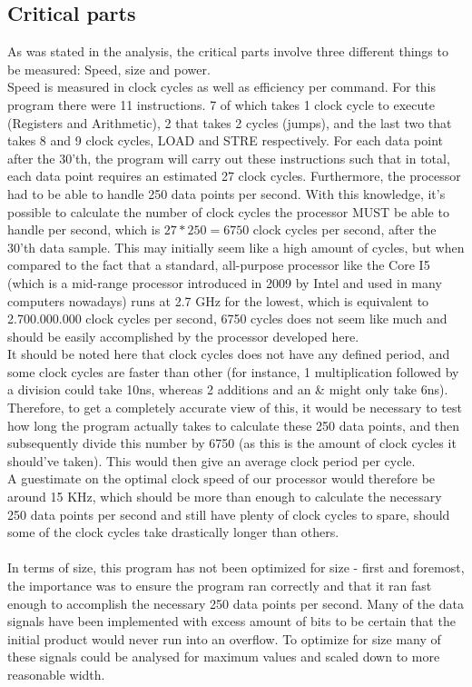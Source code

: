 \documentclass[12pt,a4paper]{article}
\begin{document}
\subsection{Critical parts}
	As was stated in the analysis, the critical parts involve three different things to be measured: Speed, size and power.\\
	Speed is measured in clock cycles as well as efficiency per command. For this program there were 11 instructions. 7 of which takes 1 clock cycle to execute (Registers and Arithmetic), 2 that takes 2 cycles (jumps), and the last two that takes 8 and 9 clock cycles, LOAD and STRE respectively. For each data point after the 30'th, the program will carry out these instructions such that in total, each data point requires an estimated 27 clock cycles. Furthermore, the processor had to be able to handle 250 data points per second. With this knowledge, it's possible to calculate the number of clock cycles the processor MUST be able to handle per second, which is $27*250=6750$ clock cycles per second, after the 30'th data sample. This may initially seem like a high amount of cycles, but when compared to the fact that a standard, all-purpose processor like the Core I5 (which is a mid-range processor introduced in 2009 by Intel and used in many computers nowadays) runs at 2.7 GHz for the lowest, which is equivalent to 2.700.000.000 clock cycles per second, 6750 cycles does not seem like much and should be easily accomplished by the processor developed here.\\
	It should be noted here that clock cycles does not have any defined period, and some clock cycles are faster than other (for instance, 1 multiplication followed by a division could take 10ns, whereas 2 additions and an \& might only take 6ns). Therefore, to get a completely accurate view of this, it would be necessary to test how long the program actually takes to calculate these 250 data points, and then subsequently divide this number by 6750 (as this is the amount of clock cycles it should've taken). This would then give an average clock period per cycle.\\
	A guestimate on the optimal clock speed of our processor would therefore be around 15 KHz, which should be more than enough to calculate the necessary 250 data points per second and still have plenty of clock cycles to spare, should some of the clock cycles take drastically longer than others.\\
	\\
	In terms of size, this program has not been optimized for size - first and foremost, the importance was to ensure the program ran correctly and that it ran fast enough to accomplish the necessary 250 data points per second. Many of the data signals have been implemented with excess amount of bits to be certain that the initial product would never run into an overflow. To optimize for size many of these signals could be analysed for maximum values and scaled down to more reasonable width.\\
\end{document}
